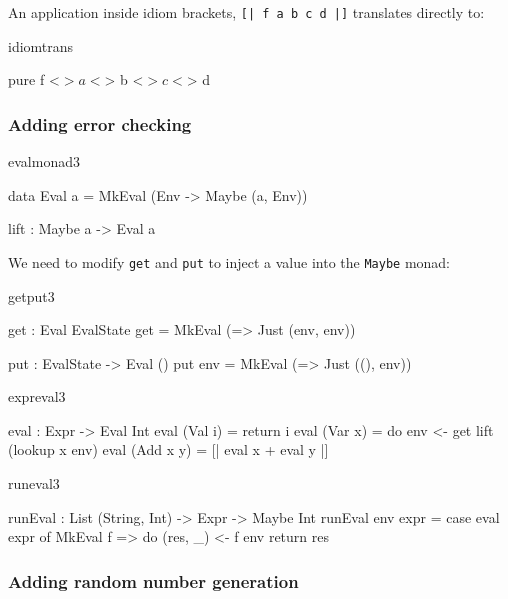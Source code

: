 \noindent
An application inside idiom brackets, \texttt{[| f a b c d |]} translates
directly to:

\begin{SaveVerbatim}{idiomtrans}

pure f <$> a <$> b <$> c <$> d

\end{SaveVerbatim}

\subsubsection{Adding error checking}

\begin{SaveVerbatim}{evalmonad3}

data Eval a = MkEval (Env -> Maybe (a, Env))

lift : Maybe a -> Eval a

\end{SaveVerbatim}

We need to modify \texttt{get} and \texttt{put} to inject a value into the
\texttt{Maybe} monad:

\begin{SaveVerbatim}{getput3}

get : Eval EvalState
get = MkEval (\env => Just (env, env))
  
put : EvalState -> Eval ()
put env = MkEval (\x => Just ((), env))

\end{SaveVerbatim}

\begin{SaveVerbatim}{expreval3}

eval : Expr -> Eval Int
eval (Val i) = return i
eval (Var x) = do env <- get
                  lift (lookup x env)
eval (Add x y) = [| eval x + eval y |]

\end{SaveVerbatim}

\begin{SaveVerbatim}{runeval3}

runEval : List (String, Int) -> Expr -> Maybe Int
runEval env expr = case eval expr of
                        MkEval f => do (res, _) <- f env
                                       return res

\end{SaveVerbatim}

\subsubsection{Adding random number generation}

